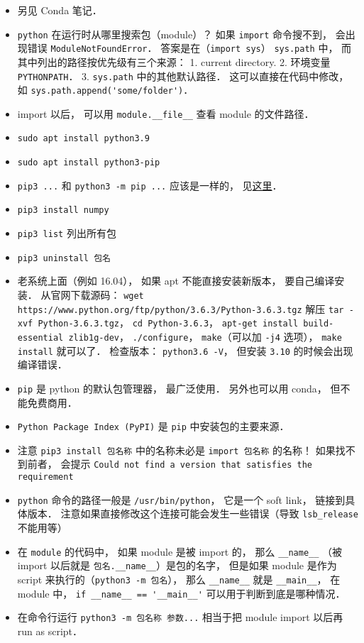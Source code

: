 

\begin{itemize}
\item 另见 Conda 笔记．
\item \verb|python| 在运行时从哪里搜索包（module）？ 如果 \verb|import| 命令搜不到， 会出现错误 \verb|ModuleNotFoundError|． 答案是在（\verb|import sys|） \verb|sys.path| 中， 而其中列出的路径按优先级有三个来源： 1. current directory. 2. 环境变量 \verb|PYTHONPATH|． 3. \verb|sys.path| 中的其他默认路径． 这可以直接在代码中修改， 如 \verb|sys.path.append('some/folder')|．
\item import 以后， 可以用 \verb|module.__file__| 查看 module 的文件路径．
\item \verb|sudo apt install python3.9|
\item \verb|sudo apt install python3-pip|
\item \verb|pip3 ...| 和 \verb|python3 -m pip ...| 应该是一样的， 见\href{https://stackoverflow.com/questions/41307101/difference-between-pip3-and-python3-m-pip}{这里}．
\item \verb|pip3 install numpy|
\item \verb|pip3 list| 列出所有包
\item \verb|pip3 uninstall 包名|
\item 老系统上面（例如 16.04）， 如果 apt 不能直接安装新版本， 要自己编译安装． 从官网下载源码： \verb|wget https://www.python.org/ftp/python/3.6.3/Python-3.6.3.tgz| 解压 \verb|tar -xvf Python-3.6.3.tgz|， \verb|cd Python-3.6.3|， \verb|apt-get install build-essential zlib1g-dev|， \verb|./configure|， \verb|make|（可以加 \verb|-j4| 选项）， \verb|make install| 就可以了． 检查版本： \verb|python3.6 -V|， 但安装 \verb|3.10| 的时候会出现编译错误．
\item \verb|pip| 是 python 的默认包管理器， 最广泛使用． 另外也可以用 conda， 但不能免费商用．
\item \verb|Python Package Index (PyPI)| 是 \verb|pip| 中安装包的主要来源．
\item 注意 \verb|pip3 install 包名称| 中的名称未必是 \verb|import 包名称| 的名称！ 如果找不到前者， 会提示 \verb|Could not find a version that satisfies the requirement|
\item \verb|python| 命令的路径一般是 \verb|/usr/bin/python|， 它是一个 soft link， 链接到具体版本． 注意如果直接修改这个连接可能会发生一些错误（导致 \verb|lsb_release| 不能用等）
\item 在 \verb|module| 的代码中， 如果 module 是被 import 的， 那么 \verb|__name__| （被 import 以后就是 \verb|包名.__name__|）是包的名字， 但是如果 module 是作为 script 来执行的（\verb|python3 -m 包名|）， 那么 \verb|__name__| 就是 \verb|__main__|， 在 module 中， \verb|if __name__ == '__main__'| 可以用于判断到底是哪种情况．
\item 在命令行运行 \verb|python3 -m 包名称 参数...| 相当于把 module import 以后再 run as script．
\end{itemize}

